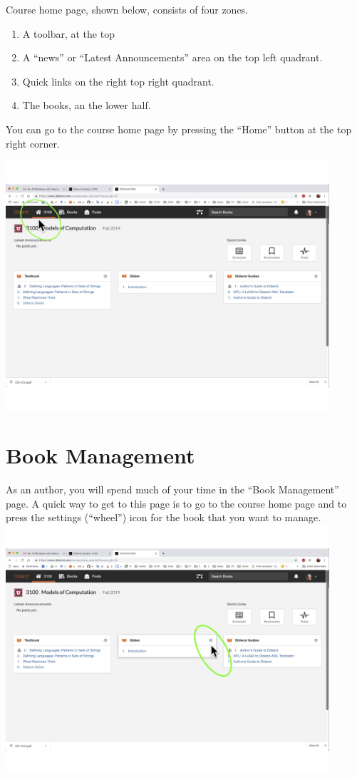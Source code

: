 \begin{gram}
Course home page, shown below, consists of four zones.
\begin{enumerate}
\item A toolbar, at the top
\item A ``news'' or ``Latest Announcements'' area on the top left quadrant.
\item Quick links on the right top right quadrant.
\item The books, an the lower half.
\end{enumerate}

You can go to the course home page by pressing the ``Home'' button at the top right corner.

\includegraphics[width=0.9\textwidth]{staff/media/course-home.jpg}
\end{gram}

\section{Book Management}

\begin{gram}
\label{guide::author::go-book-management}
As an author, you will spend much of your time in the ``Book Management'' page.
A quick way to get to this page is to go to the course home page and to press the settings (``wheel'') icon for the book that you want to manage.
%
\includegraphics[width=0.9\textwidth]{staff/media/go-to-book-management.jpg}
\end{gram}



